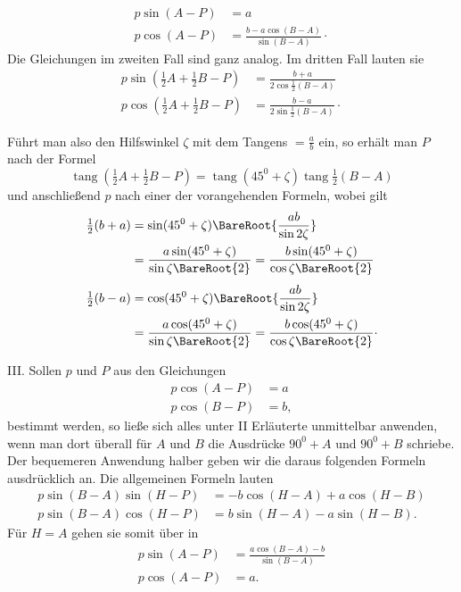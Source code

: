 \[
\begin{aligned}
p\sin(A-P)&=a\\
p\cos(A-P)&=\frac{b-a\cos(B-A)}{\sin(B-A)}\mathpunct{\cdot}
\end{aligned}
\]
Die Gleichungen im zweiten Fall sind ganz analog. Im dritten Fall lauten sie
\[
\begin{aligned}
p\sin(\tfrac{1}{2}A+\tfrac{1}{2}B-P)&=\frac{b+a}{2\cos\tfrac{1}{2}(B-A)}\\
p\cos(\tfrac{1}{2}A+\tfrac{1}{2}B-P)&=\frac{b-a}{2\sin\tfrac{1}{2}(B-A)}\mathpunct{\cdot}
\end{aligned}
\]
\par
Führt man also den Hilfswinkel $\zeta$ mit dem Tangens $=\frac{a}{b}$ ein, so erhält man $P$ nach der Formel
\[
\operatorname{tang}(\tfrac{1}{2}A+\tfrac{1}{2}B-P)=\operatorname{tang}(45^0+\zeta)\operatorname{tang}\tfrac{1}{2}(B-A)
\]
und anschließend $p$ nach einer der vorangehenden Formeln, wobei gilt
\[
\begin{aligned}
\tfrac{1}{2}(b+a)&=\sin(45^0+\zeta)\BareRoot{\frac{ab}{\sin2\zeta}}\\
&=\frac{a\sin(45^0+\zeta)}{\sin\zeta\BareRoot{2}}=\frac{b\sin(45^0+\zeta)}{\cos\zeta\BareRoot{2}}\\[.4em]
\tfrac{1}{2}(b-a)&=\cos(45^0+\zeta)\BareRoot{\frac{ab}{\sin2\zeta}}\\
&=\frac{a\cos(45^0+\zeta)}{\sin\zeta\BareRoot{2}}=\frac{b\cos(45^0+\zeta)}{\cos\zeta\BareRoot{2}}\mathpunct{\cdot}
\end{aligned}
\]
\par
III. Sollen $p$ und $P$ aus den Gleichungen
\[
\begin{aligned}
p\cos(A-P)&=a\\
p\cos(B-P)&=b,
\end{aligned}
\]
bestimmt werden, so ließe sich alles unter II Erläuterte unmittelbar anwenden, wenn man dort überall für $A$ und $B$ die Ausdrücke $90^0+A$ und $90^0+B$ schriebe. Der bequemeren Anwendung halber geben wir die daraus folgenden Formeln ausdrücklich an. Die allgemeinen Formeln lauten
\[
\begin{aligned}
p\sin(B-A)\sin(H-P)&=-b\cos(H-A)+a\cos(H-B)\\
p\sin(B-A)\cos(H-P)&=b\sin(H-A)-a\sin(H-B).
\end{aligned}
\]
Für $H=A$ gehen sie somit über in
\[
\begin{aligned}
p\sin(A-P)&=\frac{a\cos(B-A)-b}{\sin(B-A)}\\
p\cos(A-P)&=a.
\end{aligned}
\]

